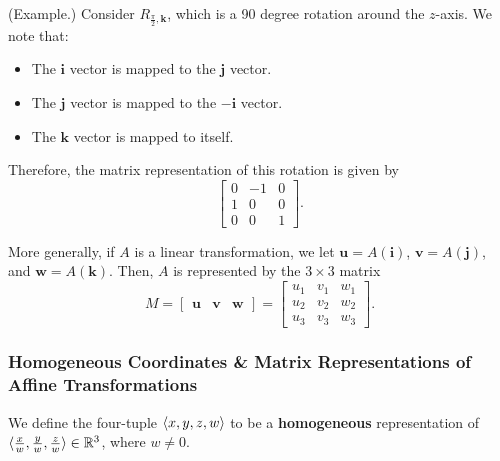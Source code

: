 \documentclass[letterpaper]{article}
\begin{document}
\begin{mdframed}[]
    (Example.) Consider $R_{\frac{\pi}{2}, \mathbf{k}}$, which is a 90 degree rotation around the $z$-axis. We note that: 
    \begin{itemize}
        \item The $\mathbf{i}$ vector is mapped to the $\mathbf{j}$ vector.
        \item The $\mathbf{j}$ vector is mapped to the $-\mathbf{i}$ vector. 
        \item The $\mathbf{k}$ vector is mapped to itself. 
    \end{itemize}
    Therefore, the matrix representation of this rotation is given by 
    \[\begin{bmatrix}
        0 & -1 & 0 \\ 
        1 & 0 & 0 \\ 
        0 & 0 & 1
    \end{bmatrix}.\]
\end{mdframed}
More generally, if $A$ is a linear transformation, we let $\mathbf{u} = A(\mathbf{i})$, $\mathbf{v} = A(\mathbf{j})$, and $\mathbf{w} = A(\mathbf{k})$. Then, $A$ is represented by the $3 \times 3$ matrix 
\[M = \begin{bmatrix}
    \mathbf{u} & \mathbf{v} & \mathbf{w}
\end{bmatrix} = \begin{bmatrix}
    u_1 & v_1 & w_1 \\ 
    u_2 & v_2 & w_2 \\ 
    u_3 & v_3 & w_3 
\end{bmatrix}.\]

\subsubsection{Homogeneous Coordinates \& Matrix Representations of Affine Transformations}
We define the four-tuple $\langle x, y, z, w \rangle$ to be a \textbf{homogeneous} representation of $\langle \frac{x}{w}, \frac{y}{w}, \frac{z}{w} \rangle \in \mathbb{R}^3$, where $w \neq 0$.

\bigskip 
\end{document}
